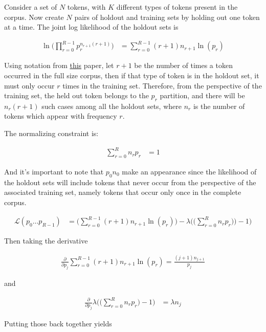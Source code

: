\documentclass{article}
\begin{document}
			Consider a set of $N$ tokens, with $K$ different types of tokens present in the corpus. Now create $N$ pairs of holdout and training sets by holding out one token at a time. The joint log likelihood of the holdout sets is
			
			\begin{align}
				\ln\bigg(\prod^{R-1}_{r=0} p_r^{n_{r+1}(r+1)} \bigg) &= \sum_{r=0}^{R-1} (r+1)n_{r+1}\ln(p_r)
			\end{align}
		
			Using notation from \href{https://ieeexplore.ieee.org/stamp/stamp.jsp?arnumber=476512&tag=1}{this} paper, let $r+1$ be the number of times a token occurred in the full size corpus, then if that type of token is in the holdout set, it must only occur $r$ times in the training set. Therefore, from the perspective of the training set, the held out token belongs to the $p_r$ partition, and there will be $n_r(r+1)$ such cases among all the holdout sets, where $n_r$ is the number of tokens which appear with frequency $r$.
			
			The normalizing constraint is:
			
			\begin{align}
				\sum^R_{r=0} n_r p_r &= 1
			\end{align}
			
			And it's important to note that $p_0n_0$ make an appearance since the likelihood of the holdout sets will include tokens that never occur from the perspective of the associated training set, namely tokens that occur only once in the complete corpus. 
		
			\begin{align}
				\mathcal{L}(p_0\ldots p_{R-1}) &= \bigg( \sum_{r=0}^{R-1} (r+1)n_{r+1}\ln(p_r)\bigg) - \lambda\bigg(\bigg(\sum^R_{r=0} n_r p_r)\bigg) -1 \bigg)
			\end{align}
			
			Then taking the derivative
			
			\begin{align}
				\frac{\partial}{\partial p_j} \sum_{r=0}^{R-1} (r+1)n_{r+1}\ln(p_r) = \frac{(j+1)n_{j+1}}{p_j}
			\end{align}
			
			and
			
			\begin{align}
				\frac{\partial}{\partial p_j} \lambda \bigg(\bigg(\sum^R_{r=0} n_r p_r\bigg)-1\bigg) &= \lambda n_j
			\end{align}
			
			Putting those back together yields
			
\end{document}
